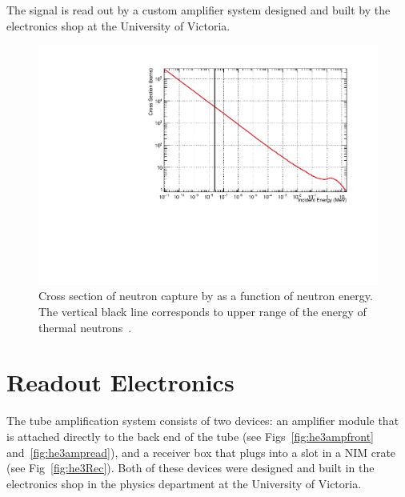 	The signal is read out by a custom amplifier system designed and built by the electronics shop at the University of Victoria. 


\begin{figure}[htb]
	\centerfloat
		\includegraphics[width=\textwidth]{images/neutron_cross_section}
	\caption[Cross section of neutron capture by \he as a function of neutron energy]{Cross section of neutron capture by \he as a function of neutron energy. The vertical black line corresponds to upper range of the energy of thermal neutrons~\cite{BNL}.}
	\label{fig:neutCross}
\end{figure}


\section{Readout Electronics}

	The \he tube amplification system consists of two devices: an amplifier module that is attached directly to the back end of the tube (see Figs~\ref{fig:he3ampfront} and~\ref{fig:he3ampread}), and a receiver box that plugs into a slot in a NIM crate (see Fig~\ref{fig:he3Rec}). Both of these devices were designed and built in the electronics shop in the physics department at the University of Victoria.

